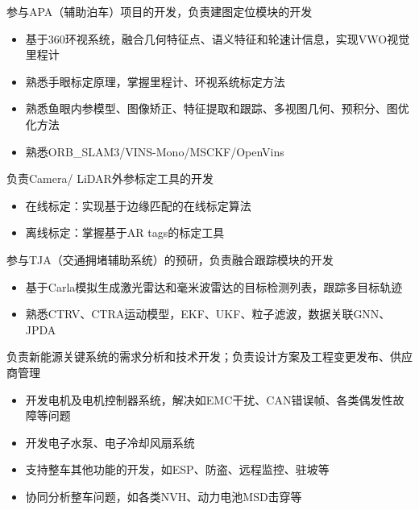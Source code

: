 \documentclass{resume}
\begin{document}
\begin{onehalfspacing}
  参与APA（辅助泊车）项目的开发，负责建图定位模块的开发
  \begin{itemize}
    \item 基于360环视系统，融合几何特征点、语义特征和轮速计信息，实现VWO视觉里程计
    \item 熟悉手眼标定原理，掌握里程计、环视系统标定方法
    \item 熟悉鱼眼内参模型、图像矫正、特征提取和跟踪、多视图几何、预积分、图优化方法
    \item 熟悉ORB\_SLAM3/VINS-Mono/MSCKF/OpenVins
  \end{itemize}

  负责Camera/ LiDAR外参标定工具的开发
  \begin{itemize}
    \item 在线标定：实现基于边缘匹配的在线标定算法
    \item 离线标定：掌握基于AR tags的标定工具
  \end{itemize}

  参与TJA（交通拥堵辅助系统）的预研，负责融合跟踪模块的开发
  \begin{itemize}
    \item 基于Carla模拟生成激光雷达和毫米波雷达的目标检测列表，跟踪多目标轨迹
    \item 熟悉CTRV、CTRA运动模型，EKF、UKF、粒子滤波，数据关联GNN、JPDA
  \end{itemize}
\end{onehalfspacing}

负责新能源关键系统的需求分析和技术开发；负责设计方案及工程变更发布、供应商管理

\begin{onehalfspacing}
  \begin{itemize}
    \item 开发电机及电机控制器系统，解决如EMC干扰、CAN错误帧、各类偶发性故障等问题
    \item 开发电子水泵、电子冷却风扇系统
    \item 支持整车其他功能的开发，如ESP、防盗、远程监控、驻坡等
    \item 协同分析整车问题，如各类NVH、动力电池MSD击穿等
  \end{itemize}
\end{onehalfspacing}
\end{document}
